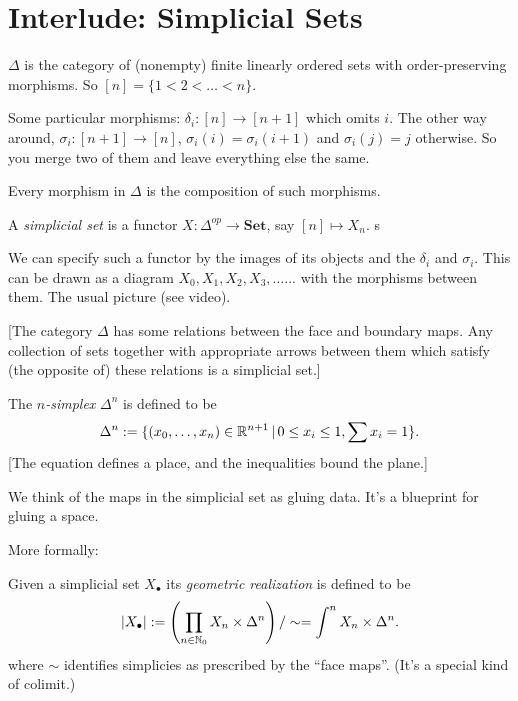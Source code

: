 \documentclass[../MH_Total.tex]{subfiles}
\begin{document}
\section{Interlude: Simplicial Sets}
\begin{definition}
	$\Delta$ is the category of (nonempty) finite linearly ordered sets with order-preserving morphisms. So $[n] = \{1 < 2 < \dots < n\}$. 
\end{definition}

\begin{example}
	Some particular morphisms: $\delta_i: [n] \to [n+1]$ which omits $i$. The other way around, $\sigma_i: [n+1] \to [n]$, $\sigma_i(i) = \sigma_i(i+1)$ and $\sigma_i(j) = j$ otherwise. So you merge two of them and leave everything else the same.
\end{example}

Every morphism in $\Delta$ is the composition of such morphisms. 

\begin{definition}
	A \emph{simplicial set} is a functor $X: \Delta^{op} \to \mathbf{Set}$, say $[n] \mapsto X_n$. s
\end{definition}

We can specify such a functor by the images of its objects and the $\delta_i$ and $\sigma_i$. This can be drawn as a diagram $X_0, X_1,X_2,X_3,\dots...$ with the morphisms between them. The usual picture (see video). 

[The category $\Delta$ has some relations between the face and boundary maps. Any collection of sets together with appropriate arrows between them which satisfy (the opposite of) these relations is a simplicial set.]

\begin{definition}
	The \emph{$n$-simplex} $\Delta^n$ is defined to be
	\[
	\Delta^n := \{(x_0,\dots,x_n) \in \mathbb{R}^{n+1}\,|\, 0 \le x_i \le 1, \sum x_i = 1\}.
	\]
	[The equation defines a place, and the inequalities bound the plane.]
\end{definition}

We think of the maps in the simplicial set as gluing data. It's a blueprint for gluing a space.

More formally:
\begin{definition}
	Given a simplicial set $X_\bullet$ its \emph{geometric realization} is defined to be
	\[
	|X_\bullet| := \left(\prod_{n \in \mathbb{N}_0} X_n \times \Delta^n\right)/\sim = \int^n X_n \times \Delta^n.
	\]
	where $\sim$ identifies simplicies as prescribed by the ``face maps''. (It's a special kind of colimit.)
\end{definition}
\end{document}
